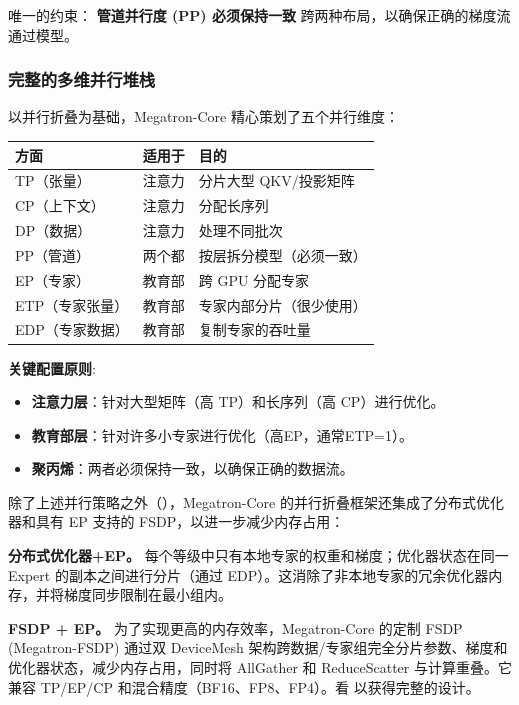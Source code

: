 唯一的约束： \textbf{管道并行度 (PP) 必须保持一致} 跨两种布局，以确保正确的梯度流通过模型。
\subsubsection{完整的多维并行堆栈}\label{sec:multi-dim-parallelism}

以并行折叠为基础，Megatron-Core 精心策划了五个并行维度：

\begin{center}
\begin{tabular}{lll}
\toprule
\textbf{方面} & \textbf{适用于} & \textbf{目的} \\
\midrule
TP（张量） & 注意力 & 分片大型 QKV/投影矩阵 \\
CP（上下文） & 注意力 & 分配长序列 \\
DP（数据） & 注意力 & 处理不同批次 \\
PP（管道） & 两个都 & 按层拆分模型（必须一致） \\
\midrule
EP（专家） & 教育部 & 跨 GPU 分配专家 \\
ETP（专家张量） & 教育部 & 专家内部分片（很少使用） \\
EDP​​（专家数据） & 教育部 & 复制专家的吞吐量 \\
\bottomrule
\end{tabular}
\end{center}

\textbf{关键配置原则}:
\begin{itemize}
    \item \textbf{注意力层}：针对大型矩阵（高 TP）和长序列（高 CP）进行优化。
    \item \textbf{教育部层}：针对许多小专家进行优化（高EP，通常ETP=1）。
    \item \textbf{聚丙烯}：两者必须保持一致，以确保正确的数据流。
\end{itemize}

除了上述并行策略之外（），Megatron-Core 的并行折叠框架还集成了分布式优化器和具有 EP 支持的 FSDP，以进一步减少内存占用：

\textbf{分布式优化器+EP。} 每个等级中只有本地专家的权重和梯度；优化器状态在同一 Expert 的副本之间进行分片（通过 EDP）。这消除了非本地专家的冗余优化器内存，并将梯度同步限制在最小组内。

\textbf{FSDP + EP。} 为了实现更高的内存效率，Megatron-Core 的定制 FSDP (Megatron-FSDP) 通过双 DeviceMesh 架构跨数据/专家组完全分片参数、梯度和优化器状态，​​减少内存占用，同时将 AllGather 和 ReduceScatter 与计算重叠。它兼容 TP/EP/CP 和混合精度（BF16、FP8、FP4）。看  以获得完整的设计。

